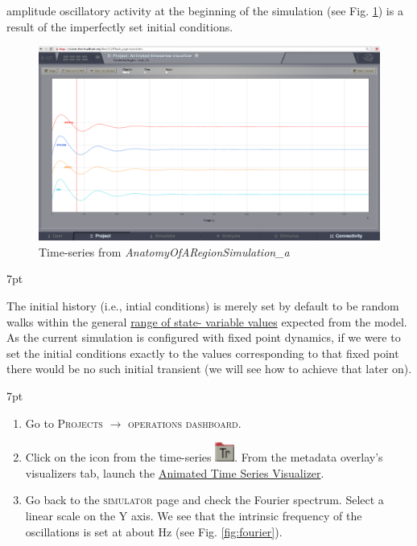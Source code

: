 \documentclass{tufte-handout}
\newenvironment{formal}{%
  \def\FrameCommand{%
    \hspace{1pt}%
    {\color{DarkBlue}\vrule width 2pt}%
    {\color{formalshade}\vrule width 4pt}%
    \colorbox{formalshade}%
  }%
  \MakeFramed{\advance\hsize-\width\FrameRestore}%
  \noindent\hspace{-4.55pt}%
  \begin{adjustwidth}{}{7pt}%
  \vspace{2pt}\vspace{2pt}%
}
{%
  \vspace{2pt}\end{adjustwidth}\endMakeFramed%
}
\newenvironment{blah}{%
  \def\FrameCommand{%
    \hspace{1pt}%
    {\color{DarkOrange}\vrule width 2pt}%
    {\color{PeachPuff}\vrule width 4pt}%
    \colorbox{PeachPuff}%
  }%
  \MakeFramed{\advance\hsize-\width\FrameRestore}%
  \noindent\hspace{-4.55pt}%
  \begin{adjustwidth}{}{7pt}%
  \vspace{2pt}\vspace{2pt}%
}
{%
  \vspace{2pt}\end{adjustwidth}\endMakeFramed%
}
\begin{document}
 amplitude oscillatory activity at the beginning of the
simulation (see Fig. \ref{fig:time_series}) is a result of the imperfectly set initial conditions.

\begin{figure}[h]
  \includegraphics[width=\linewidth]{Handout_UI_BuildingYourOwnBrainNetworkModel_AnimatedTimeSeries}%
  \caption{Time-series from \textit{AnatomyOfARegionSimulation\_a}}%
  \label{fig:time_series}%
\end{figure}
 
\begin{blah}
The initial history (i.e., intial conditions) is
merely set by default to be random walks within the general \underline{range of state-
variable values} expected from the model. 
As the current simulation is
configured with fixed point dynamics, if we were to set the initial conditions
exactly to the values corresponding to that fixed point there would be no such
initial transient (we will see how to achieve that later on).
\end{blah}


\begin{formal}
\begin{enumerate}
\item Go to \textsc{Projects} $\rightarrow$ \textsc{operations dashboard}.
\item Click on the icon from the time-series \includegraphics[width=0.05\textwidth]{nodeTimeSeriesRegion.png}. From the metadata overlay's visualizers tab, launch the \underline{Animated Time Series Visualizer}.
\item Go back to the \textsc{simulator} page and check the Fourier spectrum. Select a linear scale on the Y axis. We see that the intrinsic frequency of the oscillations is set at about \unit[11]{Hz} (see Fig. \ref{fig:fourier}). 
\end{enumerate}
\end{formal}
\end{document}
